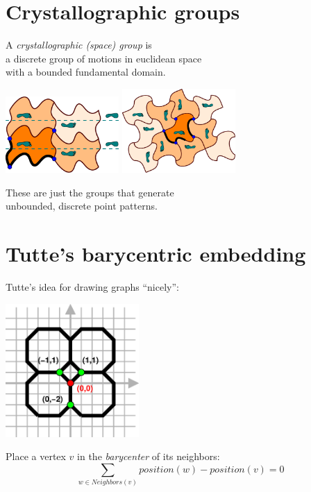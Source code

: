 \documentclass{beamer}
\begin{document}
\section{Crystallographic groups}

\begin{frame}
  \begin{center}
    A {\em crystallographic (space) group\/} is\\
    a discrete group of motions in euclidean space\\
    with a bounded fundamental domain.

    \includegraphics[width=1.7in]{heesch-TGTG}
    \qquad
    \includegraphics[width=1.7in]{heesch-C4C4C4C4C}

    These are just the groups that generate\\
    unbounded, discrete point patterns.
  \end{center}
\end{frame}


\section{Tutte's barycentric embedding}

\begin{frame}
  \begin{center}
    Tutte's idea for drawing graphs ``nicely'':

    \includegraphics[width=2in]{equilibrium1}

    Place a vertex $v$ in the {\em barycenter} of its neighbors:
    \[
    \sum_{w\in Neighbors(v)} position(w)-position(v) = 0
    \]
  \end{center}
\end{frame}
\end{document}

